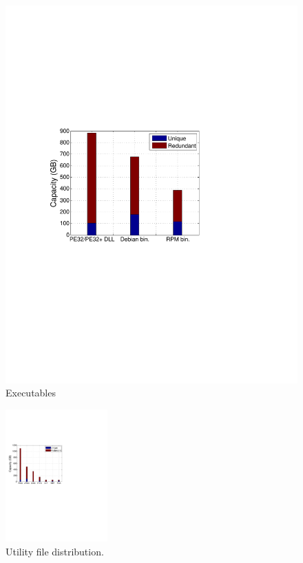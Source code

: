 \begin{figure}[t]
\begin{minipage}{0.3\textwidth}
		\includegraphics[width=1\textwidth]{graphs/type-exec-cap}
		\caption{Executables}
		\label{fig-file}
	\end{minipage}
\end{figure}

\begin{figure}
	\centering
	\includegraphics[width=0.35\textwidth]{graphs/type-image-cap}
	\caption{Utility file distribution.
	}
	\label{fig:file_size}
\end{figure}


